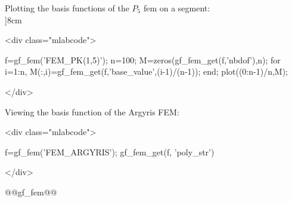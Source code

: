 \documentclass[11pt,a4paper]{article}
\newcommand{\newpage}{}
\newenvironment{minipage}[2]{}{}
\newenvironment{mcode}{\begin{rawxml}<div class="mlabcode">\end{rawxml}\begin{example}}{\end{example}\begin{rawxml}</div>\end{rawxml}}
\newenvironment{mcode}{\begin{alltt}}{\end{alltt}}
\begin{document}
\begin{cmdexamples}
  Plotting the basis functions of the $P_5$ fem on a segment:\\
  \begin{minipage}[b]{8cm}
  \begin{mcode}
f=gf_fem('FEM_PK(1,5)');
n=100; M=zeros(gf_fem_get(f,'nbdof'),n);
for i=1:n, 
  M(:,i)=gf_fem_get(f,'base_value',(i-1)/(n-1)); 
end;
plot((0:n-1)/n,M);
  \end{mcode}
  \end{minipage}  

\par
Viewing the basis function of the Argyris FEM:
\begin{mcode}
f=gf_fem('FEM_ARGYRIS');
gf_fem_get(f, 'poly_str')
\end{mcode}
\end{cmdexamples}
\begin{gfseealso}
@@gf_fem@@
\end{gfseealso}
\newpage

\end{document}
